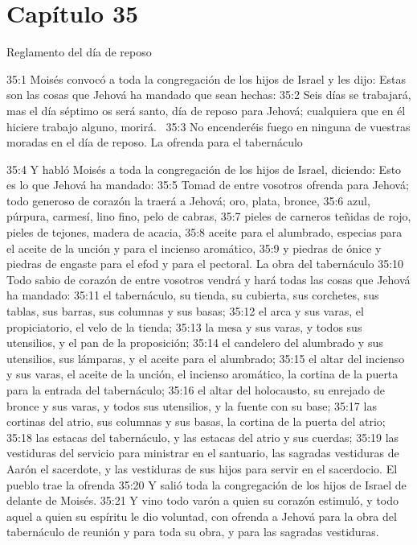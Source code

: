 \section*{Capítulo 35}
Reglamento del día de reposo 

35:1 Moisés convocó a toda la congregación de los hijos de Israel y les dijo: Estas son las cosas que Jehová ha mandado que sean hechas: 
35:2 Seis días se trabajará, mas el día séptimo os será santo, día de reposo para Jehová; cualquiera que en él hiciere trabajo alguno, morirá.  
35:3 No encenderéis fuego en ninguna de vuestras moradas en el día de reposo. 
La ofrenda para el tabernáculo 

35:4 Y habló Moisés a toda la congregación de los hijos de Israel, diciendo: Esto es lo que Jehová ha mandado: 
35:5 Tomad de entre vosotros ofrenda para Jehová; todo generoso de corazón la traerá a Jehová; oro, plata, bronce, 
35:6 azul, púrpura, carmesí, lino fino, pelo de cabras, 
35:7 pieles de carneros teñidas de rojo, pieles de tejones, madera de acacia, 
35:8 aceite para el alumbrado, especias para el aceite de la unción y para el incienso aromático, 
35:9 y piedras de ónice y piedras de engaste para el efod y para el pectoral. 
La obra del tabernáculo 
35:10 Todo sabio de corazón de entre vosotros vendrá y hará todas las cosas que Jehová ha mandado: 
35:11 el tabernáculo, su tienda, su cubierta, sus corchetes, sus tablas, sus barras, sus columnas y sus basas; 
35:12 el arca y sus varas, el propiciatorio, el velo de la tienda; 
35:13 la mesa y sus varas, y todos sus utensilios, y el pan de la proposición; 
35:14 el candelero del alumbrado y sus utensilios, sus lámparas, y el aceite para el alumbrado; 
35:15 el altar del incienso y sus varas, el aceite de la unción, el incienso aromático, la cortina de la puerta para la entrada del tabernáculo; 
35:16 el altar del holocausto, su enrejado de bronce y sus varas, y todos sus utensilios, y la fuente con su base; 
35:17 las cortinas del atrio, sus columnas y sus basas, la cortina de la puerta del atrio; 
35:18 las estacas del tabernáculo, y las estacas del atrio y sus cuerdas; 
35:19 las vestiduras del servicio para ministrar en el santuario, las sagradas vestiduras de Aarón el sacerdote, y las vestiduras de sus hijos para servir en el sacerdocio. 
El pueblo trae la ofrenda 
35:20 Y salió toda la congregación de los hijos de Israel de delante de Moisés. 
35:21 Y vino todo varón a quien su corazón estimuló, y todo aquel a quien su espíritu le dio voluntad, con ofrenda a Jehová para la obra del tabernáculo de reunión y para toda su obra, y para las sagradas vestiduras. 
